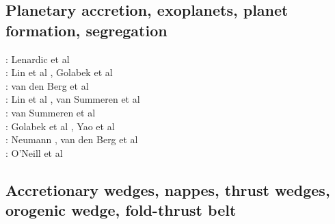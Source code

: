 \begin{scriptsize}
\cite{begl94b}
\cite{belg95a}
\cite{belg95b}
\cite{bekf96}\cite{como96}
\cite{bekk97}
\cite{pobe98}\cite{zhat98}
\cite{hans03}\cite{katf04}
\cite{huvv04}
\cite{yiha10}\cite{libe10}
\end{scriptsize}

\subsection{Planetary accretion, exoplanets, planet formation, segregation}

\begin{scriptsize}
\twothousandeight: Lenardic et al \cite{lejm08} \\
\twothousandnine: Lin et al \cite{ligt09}, Golabek et al \cite{gogk09}\\
\twothousandten: van den Berg et al \cite{vayb10}\\
\twothousandeleven: Lin et al \cite{ligt11}, van Summeren et al \cite{vacg11}\\
\twothousandthirteen: van Summeren et al \cite{vagc13}\\
\twothousandfourteen: Golabek et al \cite{gobg14}, Yao et al \cite{yadl14}\\
\twothousandnineteen: Neumann \cite{neum19}, van den Berg et al \cite{vayu19}\\
\twothousandtwenty: O'Neill et al \cite{onlw20}
\end{scriptsize}

\subsection{Accretionary wedges, nappes, thrust wedges, orogenic wedge, fold-thrust belt} 

